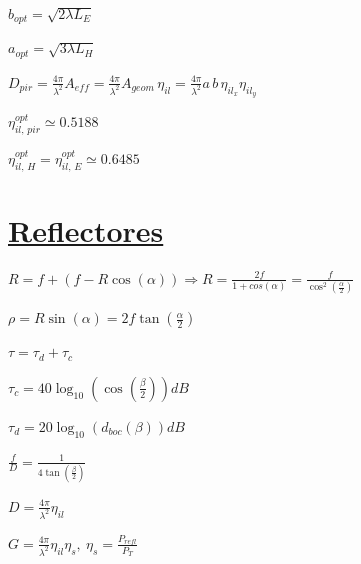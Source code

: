 \documentclass[twocolumn, 8pt]{extarticle}
\begin{document}
\vspace{0.5cm}
\( b_{opt} = \sqrt{ 2\lambda L_E } \)

\vspace{0.5cm}
\( a_{opt} = \sqrt{ 3\lambda L_H } \)

\vspace{0.5cm}
\( D_{pir} = \frac{ 4\pi }{ \lambda^2 } A_{eff} = \frac{ 4\pi }{ \lambda^2 } A_{geom} \, \eta_{il} = \frac{ 4\pi }{ \lambda^2 } a \, b \, \eta_{il_x} \eta_{il_y} \)

\vspace{0.5cm}
\( \eta^{opt}_{il ,\, pir} \simeq 0.5188 \)

\vspace{0.5cm}
\( \eta^{opt}_{il ,\, H} =  \eta^{opt}_{il ,\, E} \simeq 0.6485 \)

\vspace{0.5cm}
\section*{\underline{Reflectores}}

\( R = f + (f - R\cos(\alpha)) \Rightarrow R = \frac{2f}{1 + cos(\alpha)} = \frac{f}{\cos^2\left(\frac{\alpha}{2}\right)}\)

\vspace{0.5cm}
\( \rho = R \sin(\alpha) = 2f \tan\left(\frac{\alpha}{2}\right) \)

\vspace{0.5cm}
\( \tau = \tau_d + \tau_c\)

\vspace{0.5cm}
\( \tau_c = 40\log_{10}\left(\cos\left(\frac{\beta}{2}\right)\right) dB \)

\vspace{0.5cm}
\( \tau_d = 20\log_{10}(d_{boc}(\beta)) dB \)

\vspace{0.5cm}
\( \frac{f}{D} = \frac{1}{4\tan\left(\frac{\beta}{2}\right)} \)

\vspace{0.5cm}
\( D = \frac{4\pi}{\lambda^2} \eta_{il} \)

\vspace{0.5cm}
\( G = \frac{4\pi}{\lambda^2} \eta_{il} \eta_{s},\ \eta_{s} = \frac{P_{refl}}{P_T} \)

\newpage
\end{document}
